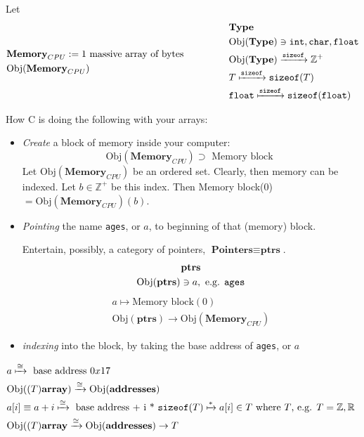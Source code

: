 \documentclass[10pt]{amsart}
\begin{document}
\begin{multicols*}{2}
Let 
\[
\begin{gathered}
\begin{aligned}
& \textbf{Memory}_{CPU} := 1 \text{ massive array of bytes } \\
& \text{Obj}{(\textbf{Memory}_{CPU})} 
\end{aligned}  \qquad \, \qquad \, 
\begin{aligned}
	& \textbf{Type} \\
	& \text{Obj}{(\textbf{Type})} \ni \verb|int|, \verb|char|, \verb|float| \\
	& \text{Obj}{(\textbf{Type})}  \xrightarrow{\texttt{sizeof}} \mathbb{Z}^+  \\
	& T \xmapsto{ \texttt{sizeof} } \verb|sizeof|(T) \\
	& \verb|float| \xmapsto{ \texttt{sizeof}} \verb|sizeof|(\verb|float|)
\end{aligned}
\end{gathered}
\]


  How C is doing the following with your arrays:  

\begin{itemize}
	\item \emph{Create} a block of memory inside your computer:  
	\[
	\text{Obj}{(\textbf{Memory}_{CPU})} \supset \text{ Memory block }  
	\]
	Let $\text{Obj}{(\textbf{Memory}_{CPU})}$ be an ordered set.  Clearly, then memory can be indexed.  Let $b\in \mathbb{Z}^+$ be this index.  Then Memory block(0) $= \text{Obj}{(\textbf{Memory}_{CPU})}(b)$.  		
	\item \emph{Pointing} the name \verb|ages|, or $a$, to beginning of that (memory) block.  
	
		Entertain, possibly, a category of pointers, $\textbf{Pointers} \equiv \textbf{ptrs}$.  
\[
\begin{gathered}
	\textbf{ptrs} \\
	\text{Obj}{(\textbf{ptrs})} \ni a, \text{ e.g. } \verb|ages|  
\end{gathered}
\]	
\[
	\begin{gathered}
	a \mapsto \text{Memory block}(0) \\ 
	\text{Obj}{(\textbf{ptrs})} \to \text{Obj}{(\textbf{Memory}_{CPU})}
\end{gathered}
\]
	\item \emph{indexing} into the block, by taking the base address of \verb|ages|, or $a$ 
\end{itemize}

\[
\begin{gathered}
\begin{aligned}
&	a \xmapsto{ \cong } \text{ base address $0x17$ } \\
&	\text{Obj}{((T)\textbf{array})} \xrightarrow{ \cong } \text{Obj}{(\textbf{addresses})}  \\	
&	a[i] \equiv a+i \xmapsto{ \cong } \text{ base address + i * } \verb|sizeof|(T)  \xmapsto{ * } a[i] \in T \text{ where $T$, e.g. $T = \mathbb{Z},\mathbb{R}$ } \\ 
& \text{Obj}{((T)\textbf{array}} \xrightarrow{ \cong } \text{Obj}{(\textbf{addresses})} \to T  
\end{aligned}
\end{gathered}
\]


\end{multicols*}
\end{document}
